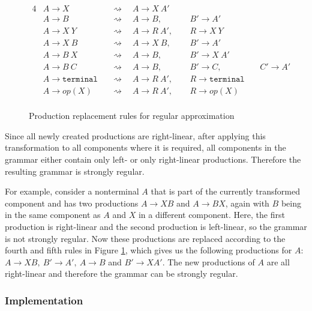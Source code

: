 \begin{figure}[!h]
	\begin{alignat*}{4}
		& A \rightarrow X 	 && \rightsquigarrow \quad A \rightarrow X\ A'\ \  & &\\
		& A \rightarrow B 	 && \rightsquigarrow \quad A \rightarrow B,\ \ 	   & &B' \rightarrow A'\ &&\\
		& A \rightarrow X\ Y && \rightsquigarrow \quad A \rightarrow R\ A',\ \ & &R  \rightarrow X\ Y\ &&\\
		& A \rightarrow X\ B && \rightsquigarrow \quad A \rightarrow X\ B,\ \  & &B' \rightarrow A'\ &&\\
		& A \rightarrow B\ X && \rightsquigarrow \quad A \rightarrow B,\ \ 	   & &B' \rightarrow X\ A'\ &&\\
		& A \rightarrow B\ C && \rightsquigarrow \quad A \rightarrow B,\ \     & &B' \rightarrow C,\ &&C' \rightarrow A'\\
		& A \rightarrow \texttt{terminal} && \rightsquigarrow \quad A \rightarrow R\ A',\ \ & &R \rightarrow \texttt{terminal}\ &&\\
		& A \rightarrow op(X) && \rightsquigarrow  \quad A \rightarrow R\ A',\ \ & &R \rightarrow op(X)\ &&\\
	\end{alignat*}
\caption{Production replacement rules for regular approximation}
\label{fig:approx:prodreplacement}
\end{figure}
Since all newly created productions are right-linear, after applying this transformation to all components where it is required, all components in the grammar either contain only left- or only right-linear productions. Therefore the resulting grammar is strongly regular.

For example, consider a nonterminal $A$ that is part of the currently transformed component and has two productions $A \rightarrow X B$ and $A \rightarrow B X$, again with $B$ being in the same component as $A$ and $X$ in a different component. Here, the first production is right-linear and the second production is left-linear, so the grammar is not strongly regular.
Now these productions are replaced according to the fourth and fifth rules in Figure \ref{fig:approx:prodreplacement}, which gives us the following productions for $A$: $A \rightarrow XB,\ B' \rightarrow A',\ A \rightarrow B$ and $B' \rightarrow X A'$.
The new productions of $A$ are all right-linear and therefore the grammar can be strongly regular.

\subsubsection{Implementation}

